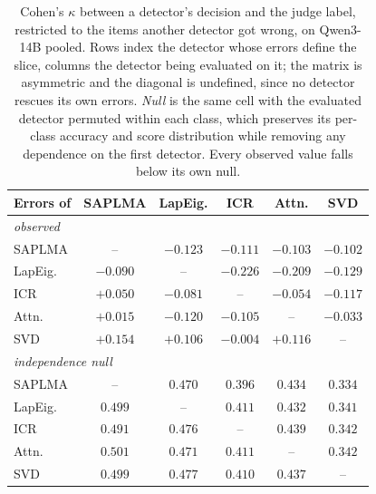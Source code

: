 \begin{table}[t]
  \centering
  \caption{Cohen's $\kappa$ between a detector's decision and the judge label,
  restricted to the items another detector got wrong, on Qwen3-14B pooled. Rows
  index the detector whose errors define the slice, columns the detector being
  evaluated on it; the matrix is asymmetric and the diagonal is undefined, since
  no detector rescues its own errors. \emph{Null} is the same cell with the
  evaluated detector permuted within each class, which preserves its per-class
  accuracy and score distribution while removing any dependence on the first
  detector. Every observed value falls below its own null.}
  \label{tab:conditional_kappa}
  \footnotesize
  \begin{tabular}{l c c c c c}
    \hline
    Errors of & SAPLMA & LapEig. & ICR & Attn. & SVD \\
    \hline
    \multicolumn{6}{l}{\itshape observed} \\
    SAPLMA & -- & $-0.123$ & $-0.111$ & $-0.103$ & $-0.102$ \\
    LapEig. & $-0.090$ & -- & $-0.226$ & $-0.209$ & $-0.129$ \\
    ICR & $+0.050$ & $-0.081$ & -- & $-0.054$ & $-0.117$ \\
    Attn. & $+0.015$ & $-0.120$ & $-0.105$ & -- & $-0.033$ \\
    SVD & $+0.154$ & $+0.106$ & $-0.004$ & $+0.116$ & -- \\
    \hline
    \multicolumn{6}{l}{\itshape independence null} \\
    SAPLMA & -- & $0.470$ & $0.396$ & $0.434$ & $0.334$ \\
    LapEig. & $0.499$ & -- & $0.411$ & $0.432$ & $0.341$ \\
    ICR & $0.491$ & $0.476$ & -- & $0.439$ & $0.342$ \\
    Attn. & $0.501$ & $0.471$ & $0.411$ & -- & $0.342$ \\
    SVD & $0.499$ & $0.477$ & $0.410$ & $0.437$ & -- \\
    \hline
  \end{tabular}
\end{table}


